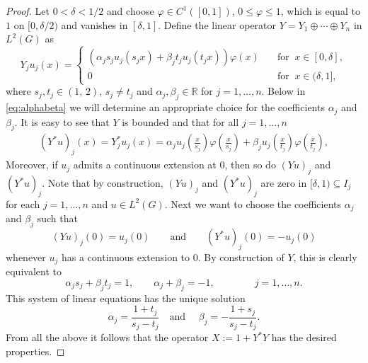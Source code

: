 \documentclass{article}
\numberwithin{equation}{section}
\theoremstyle{definition}
\begin{document}
\begin{proof}
   Let $0<\delta<1/2$ and choose $\varphi\in C^1([0,1])$, $0\leq\varphi\leq1$, which is equal to $1$ on $[0,\delta/2)$ and vanishes in $[\delta,1]$. Define the linear operator $Y=Y_1\oplus\cdots\oplus Y_n$ in $L^2(G)$ as
   \begin{equation}
      \label{eq:axillary_operator_Y}
      Y_j u_j(x) = 
      \begin{cases}
	 \left(\alpha_j s_j u_j(s_j x) + \beta_j t_j u_j(t_j x)\right)\varphi(x) \quad & \text{for }\ x\in [0,\delta], \\[1ex]
	 0\quad & \text{for }\ x\in (\delta,1],
      \end{cases}
   \end{equation}
   where  $s_j ,t_j \in (1,\, 2)$, $s_j \neq t_j$ and $\alpha_j, \beta_j \in \mathbb R$ for $j=1,\dots, n$.  
   Below in \eqref{eq:alphabeta} we will determine an appropriate choice for the coefficients $\alpha_j$ and $\beta_j$.
   It is easy to see that $Y$ is bounded and that for all $j=1, \dots, n$
   \begin{align}
      \label{eq:axillary_operator_Ystar}
      ( Y^*u)_j (x) = Y_j^*u_j (x) 
      =  
      \alpha_j u_j\left(\frac{x}{s_j}\right)\varphi \left(\frac{x}{s_j}\right) 
      + \beta_j u_j\left(\frac{x}{t_j}\right)\varphi \left(\frac{x}{t_j}\right),
   \end{align}
   Moreover, if $u_j$ admits a continuous extension at $0$, then so do $(Yu)_j$ and $(Y^*u)_j$. Note that by construction, $(Yu)_j$ and $(Y^*u)_j$ are zero in $[\delta, 1)\subseteq I_j$ for each $j=1, \dots, n$ and $u\in L^2(G)$. 
   Next we want to choose the coefficients $\alpha_j$ and $\beta_j$ such that 
   \begin{equation}
      \label{eq:alphabeta}
      (Yu)_j(0) = u_j(0) \qquad\text{and}\qquad  (Y^*u)_j(0) = -u_j(0)
   \end{equation}
   whenever $u_j$ has a continuous extension to $0$. By construction of $Y$, this is clearly equivalent to
   \begin{equation}
      \alpha_j s_j + \beta_j t_j  = 1, \qquad \alpha_j + \beta_j  = -1, \qquad\qquad j = 1, \dots, n.
   \end{equation}
   This system of linear equations has the unique solution
   \begin{equation*}
      \alpha_j =  \frac{1+t_j}{s_j- t_j} \quad \mbox{and }\quad\beta_j =  -\frac{1+s_j}{s_j- t_j}.
   \end{equation*}
   From all the above it follows that the operator $X := 1 + Y^*Y$ has the desired properties.
\end{proof}
\end{document}
